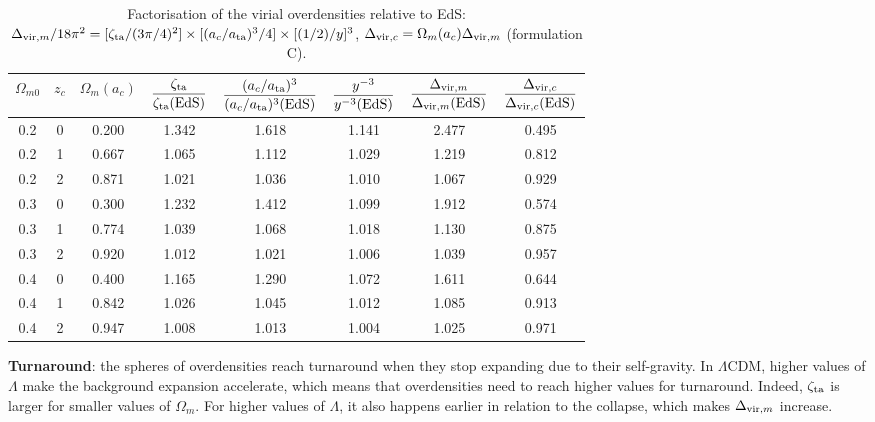 \documentclass[11pt,a4paper]{article}
\begin{document}
\begin{table}[htbp]
\centering
\caption{Factorisation of the virial overdensities relative to EdS: $\Delta_{{\rm vir},m}/18\pi^2 = [\zeta_{\rm ta}/(3\pi/4)^2]\times[(a_c/a_{\rm ta})^3/4]\times[(1/2)/y]^3$, $\Delta_{{\rm vir},c}=\Omega_m(a_c)\Delta_{{\rm vir},m}$ (formulation C).}
\label{tab:factors}
\small
\setlength{\tabcolsep}{4pt}
\begin{tabular}{c c c c c c c c}
\toprule
$\Omega_{m0}$ & $z_c$ & $\Omega_m(a_c)$ & $\dfrac{\zeta_{\rm ta}}{\zeta_{\rm ta}({\rm EdS})}$ & $\dfrac{(a_c/a_{\rm ta})^3}{(a_c/a_{\rm ta})^3({\rm EdS})}$ & $\dfrac{y^{-3}}{y^{-3}({\rm EdS})}$ & $\dfrac{\Delta_{{\rm vir},m}}{\Delta_{{\rm vir},m}({\rm EdS})}$ & $\dfrac{\Delta_{{\rm vir},c}}{\Delta_{{\rm vir},c}({\rm EdS})}$\\
\midrule
0.2 & 0 & 0.200 & 1.342 & 1.618 & 1.141 & 2.477 & 0.495\\
0.2 & 1 & 0.667 & 1.065 & 1.112 & 1.029 & 1.219 & 0.812\\
0.2 & 2 & 0.871 & 1.021 & 1.036 & 1.010 & 1.067 & 0.929\\
0.3 & 0 & 0.300 & 1.232 & 1.412 & 1.099 & 1.912 & 0.574\\
0.3 & 1 & 0.774 & 1.039 & 1.068 & 1.018 & 1.130 & 0.875\\
0.3 & 2 & 0.920 & 1.012 & 1.021 & 1.006 & 1.039 & 0.957\\
0.4 & 0 & 0.400 & 1.165 & 1.290 & 1.072 & 1.611 & 0.644\\
0.4 & 1 & 0.842 & 1.026 & 1.045 & 1.012 & 1.085 & 0.913\\
0.4 & 2 & 0.947 & 1.008 & 1.013 & 1.004 & 1.025 & 0.971\\
\bottomrule
\end{tabular}
\end{table}

\textbf{Turnaround}: the spheres of overdensities reach turnaround when they stop expanding due to their self-gravity. In $\Lambda$CDM, higher values of $\Lambda$ make the background expansion accelerate, which means that overdensities need to reach higher values for turnaround. Indeed, $\zeta_{\rm ta}$ is larger for smaller values of $\Omega_m$. For higher values of $\Lambda$, it also happens earlier in relation to the collapse, which makes $\Delta_{{\rm vir},m}$ increase.
\end{document}
